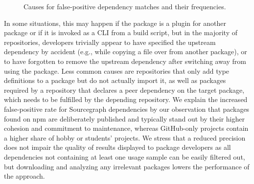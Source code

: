 \documentclass[a4paper,twoside]{article}
\begin{document}
\begin{figure}[t]
%
	\caption{Causes for false-positive dependency matches and their frequencies.}
	\label{fig:evaluation/resqu1/fp_causes}
\end{figure}
%
In some situations, this may happen if the package is a plugin for another package or if it is invoked as a CLI from a build script, but in the majority of repositories, developers trivially appear to have specified the upstream dependency by accident (e.g., while copying a  file over from another package), or to have forgotten to remove the upstream dependency after switching away from using the package.
Less common causes are repositories that only add type definitions to a package but do not actually import it, as well as packages required by a repository that declares a peer dependency on the target package, which needs to be fulfilled by the depending repository.
%
We explain the increased false-positive rate for Sourcegraph dependencies by our observation that packages found on npm are deliberately published and typically stand out by their higher cohesion and commitment to maintenance, whereas GitHub-only projects contain a higher share of hobby or students' projects.
%
We stress that a reduced precision does not impair the quality of results displayed to package developers as all dependencies not containing at least one
usage sample can be easily filtered out, but downloading and analyzing any irrelevant packages lowers the performance of the approach.
\end{document}
